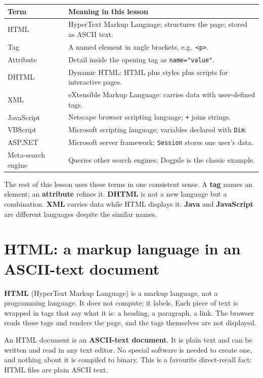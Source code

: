 \begin{center}
\begin{tabular}{p{}p{}}
\toprule
\textbf{Term} & \textbf{Meaning in this lesson} \\
\midrule
HTML & HyperText Markup Language; structures the page; stored as ASCII text. \\
Tag & A named element in angle brackets, e.g.\ \texttt{<p>}. \\
Attribute & Detail inside the opening tag as \texttt{name="value"}. \\
DHTML & Dynamic HTML: HTML plus styles plus scripts for interactive pages. \\
XML & eXtensible Markup Language: carries data with user-defined tags. \\
JavaScript & Netscape browser scripting language; \texttt{+} joins strings. \\
VBScript & Microsoft scripting language; variables declared with \texttt{Dim}. \\
ASP.NET & Microsoft server framework; \texttt{Session} stores one user's data. \\
Meta-search engine & Queries other search engines; Dogpile is the classic example. \\
\bottomrule
\end{tabular}
\end{center}

The rest of this lesson uses these terms in one consistent sense. A \textbf{tag} names an element; an \textbf{attribute} refines it. \textbf{DHTML} is not a new language but a combination. \textbf{XML} carries data while HTML displays it. \textbf{Java} and \textbf{JavaScript} are different languages despite the similar names.

\section{HTML: a markup language in an ASCII-text document}
\textbf{HTML} (HyperText Markup Language) is a markup language, not a programming language. It does not compute; it labels. Each piece of text is wrapped in tags that say what it is: a heading, a paragraph, a link. The browser reads these tags and renders the page, and the tags themselves are not displayed.

An HTML document is an \textbf{ASCII-text document}. It is plain text and can be written and read in any text editor. No special software is needed to create one, and nothing about it is compiled to binary. This is a favourite direct-recall fact: HTML files are plain ASCII text.

